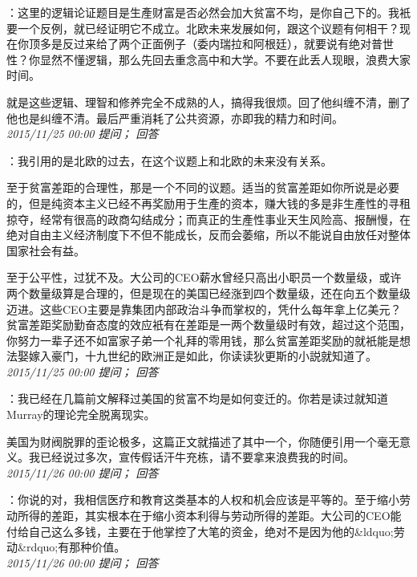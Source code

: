 \documentclass[twocolumn]{ctexart}
\begin{document}
：这里的逻辑论证题目是生產财富是否必然会加大贫富不均，是你自己下的。我衹要一个反例，就已经证明它不成立。北欧未来发展如何，跟这个议题有何相干？现在你顶多是反过来给了两个正面例子（委内瑞拉和阿根廷），就要说有绝对普世性？你显然不懂逻辑，那么先回去重念高中和大学。不要在此丢人现眼，浪费大家时间。

就是这些逻辑、理智和修养完全不成熟的人，搞得我很烦。回了他纠缠不清，删了他也是纠缠不清。最后严重消耗了公共资源，亦即我的精力和时间。\\

\textit{\hfill\noindent\small 2015/11/25 00:00 提问； 回答}

：我引用的是北欧的过去，在这个议题上和北欧的未来没有关系。

至于贫富差距的合理性，那是一个不同的议题。适当的贫富差距如你所说是必要的，但是纯资本主义已经不再奖励用于生產的资本，赚大钱的多是非生產性的寻租掠夺，经常有很高的政商勾结成分；而真正的生產性事业天生风险高、报酬慢，在绝对自由主义经济制度下不但不能成长，反而会萎缩，所以不能说自由放任对整体国家社会有益。

至于公平性，过犹不及。大公司的CEO薪水曾经只高出小职员一个数量级，或许两个数量级算是合理的，但是现在的美国已经涨到四个数量级，还在向五个数量级迈进。这些CEO主要是靠集团内部政治斗争而掌权的，凭什么每年拿上亿美元？贫富差距奖励勤奋态度的效应衹有在差距是一两个数量级时有效，超过这个范围，你努力一辈子还不如富家子弟一个礼拜的零用钱，那么贫富差距奖励的就衹能是想法娶嫁入豪门，十九世纪的欧洲正是如此，你读读狄更斯的小説就知道了。\\

\textit{\hfill\noindent\small 2015/11/25 00:00 提问； 回答}

：我已经在几篇前文解释过美国的贫富不均是如何变迁的。你若是读过就知道Murray的理论完全脱离现实。

美国为财阀脱罪的歪论极多，这篇正文就描述了其中一个，你随便引用一个毫无意义。我已经说过多次，宣传假话汗牛充栋，请不要拿来浪费我的时间。\\

\textit{\hfill\noindent\small 2015/11/26 00:00 提问； 回答}

：你说的对，我相信医疗和教育这类基本的人权和机会应该是平等的。至于缩小劳动所得的差距，其实根本在于缩小资本利得与劳动所得的差距。大公司的CEO能付给自己这么多钱，主要在于他掌控了大笔的资金，绝对不是因为他的\&ldquo;劳动\&rdquo;有那种价值。\\

\textit{\hfill\noindent\small 2015/11/26 00:00 提问； 回答}
\end{document}
